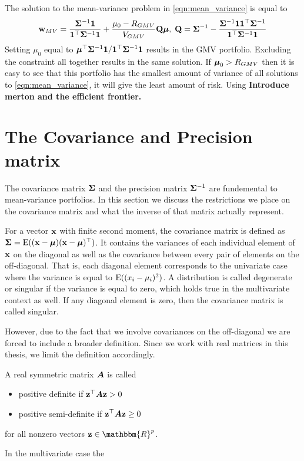 \documentclass[]{book}
\begin{document}
The solution to the mean-variance problem in \eqref{eqn:mean_variance} is equal to
\begin{equation}\label{eqn:mean_var_solution}
	\mathbf{w}_{MV} = \frac{\mathbf{\Sigma}^{-1}\mathbf{1}}{\mathbf{1}^\top \mathbf{\Sigma}^{-1}\mathbf{1}} + \frac{\mu_0 - R_{GMV}}{V_{GMV}} \mathbf{Q} \mbox{\boldmath$\mu$},\; \mathbf{Q} = \mathbf{\Sigma}^{-1} - \frac{\mathbf{\Sigma}^{-1} \mathbf{1} \mathbf{1}^\top \mathbf{\Sigma}^{-1}}{\mathbf{1}^\top \mathbf{\Sigma}^{-1} \mathbf{1}}
\end{equation}
Setting $\mu_0$ equal to $\mbox{\boldmath$\mu$}^\top \mathbf{\Sigma}^{-1} \mathbf{1} / \mathbf{1}^\top \mathbf{\Sigma}^{-1} \mathbf{1}$ results in the GMV portfolio. Excluding the constraint all together results in the same solution. If $\mbox{\boldmath$\mu$}_0>R_{GMV}$ then it is easy to see that this portfolio has the smallest amount of variance of all solutions to \eqref{eqn:mean_variance}, it will give the least amount of risk. Using
\textbf{Introduce merton and the efficient frontier.}

\section{The Covariance and Precision matrix}
The covariance matrix $\mathbf{\Sigma}$ and the precision matrix $\mathbf{\Sigma}^{-1}$ are fundemental to mean-variance portfolios. In this section we discuss the restrictions we place on the covariance matrix and what the inverse of that matrix actually represent. 

For a vector $\mathbf{x}$ with finite second moment, the covariance matrix is defined as $\mathbf{\Sigma}=\operatorname{E}((\mathbf{x} - \mbox{\boldmath$\mu$})(\mathbf{x} - \mbox{\boldmath$\mu$})^\top)$. 
It contains the variances of each individual element of $\mathbf{x}$ on the diagonal as well as the covariance between every pair of elements on the off-diagonal. 
That is, each diagonal element corresponds to the univariate case where the variance is equal to $\operatorname{E}((x_i - \mu_i)^2)$. 
A distribution is called degenerate or singular if the variance is equal to zero, which holds true in the multivariate context as well. 
If any diagonal element is zero, then the covariance matrix is called singular.  

However, due to the fact that we involve covariances on the off-diagonal we are forced to include a broader definition.  
Since we work with real matrices in this thesis, we limit the definition accordingly.
\begin{definition}
	A real symmetric matrix $\mbox{\boldmath$A$}$ is called 
	\begin{itemize}
		\item positive definite if $\mathbf{z}^\top \mbox{\boldmath$A$} \mathbf{z} > 0$
		\item positive semi-definite if $\mathbf{z}^\top \mbox{\boldmath$A$} \mathbf{z} \geq 0$
	\end{itemize}
	for all nonzero vectors $\bz \in \mathbbm{R}^p$.
\end{definition} 
In the multivariate case the 
\end{document}
